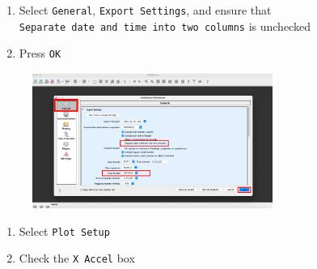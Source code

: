 \documentclass[
  letterpaper,
  DIV=11,
  numbers=noendperiod]{scrreprt}
\providecommand{\tightlist}{%
  \setlength{\itemsep}{0pt}\setlength{\parskip}{0pt}}\usepackage{longtable,booktabs,array}
\begin{document}
\begin{enumerate}
\def\labelenumi{\arabic{enumi}.}
\setcounter{enumi}{2}
\tightlist
\item
  Select \texttt{General}, \texttt{Export\ Settings}, and ensure that
  \texttt{Separate\ date\ and\ time\ into\ two\ columns} is unchecked
\item
  Press \texttt{OK}
\end{enumerate}

\begin{figure}

{\centering \includegraphics[width=0.7\textwidth,height=\textheight]{chapters/figs/HOBOExportStep2.png}

}

\end{figure}

\begin{enumerate}
\def\labelenumi{\arabic{enumi}.}
\setcounter{enumi}{4}
\tightlist
\item
  Select \texttt{Plot\ Setup}
\item
  Check the \texttt{X\ Accel} box
\end{enumerate}
\end{document}
